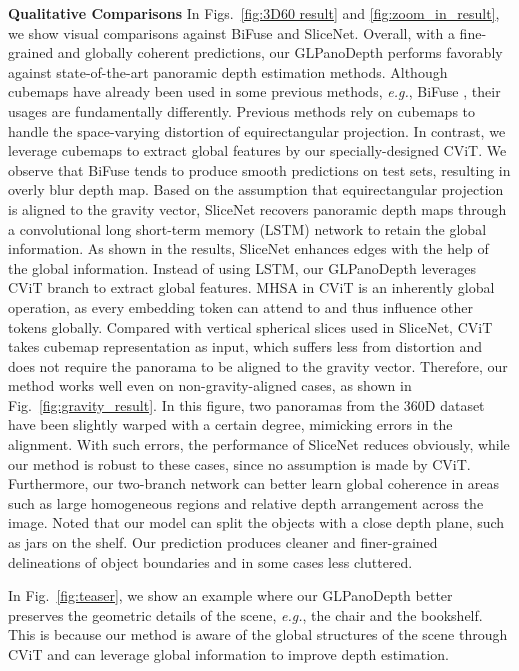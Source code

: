 \documentclass[10pt,twocolumn,letterpaper]{article}
\begin{document}
\textbf{Qualitative Comparisons }
In Figs.~\ref{fig:3D60 result} and \ref{fig:zoom_in_result}, we show visual comparisons against BiFuse and SliceNet.
Overall, with a fine-grained and globally coherent predictions, our GLPanoDepth performs favorably against state-of-the-art panoramic depth estimation methods.
Although cubemaps have already been used in some previous methods, \emph{e.g.}, BiFuse \cite{9157424}, their usages are fundamentally differently. Previous methods rely on cubemaps to handle the space-varying distortion of equirectangular projection. In contrast, we leverage cubemaps to extract global features by our specially-designed CViT. 
We observe that BiFuse tends to produce smooth predictions on test sets,
resulting in overly blur depth map. 
Based on the assumption that equirectangular projection is aligned to the gravity vector, SliceNet recovers panoramic depth maps through a convolutional long short-term memory (LSTM) network to retain the global information. As shown in the results, SliceNet enhances edges with the help of the global information. Instead of using LSTM, our GLPanoDepth leverages CViT branch to extract global features. MHSA in CViT is an inherently global operation, as every embedding token can attend to and thus influence other tokens globally. 
Compared with vertical spherical slices used in SliceNet, CViT takes cubemap representation as input, which suffers less from distortion and does not require the panorama to be aligned to the gravity vector. Therefore, our method works well even on non-gravity-aligned cases, as shown in Fig.~\ref{fig:gravity_result}. In this figure, two panoramas from the 360D dataset have been slightly warped with a certain degree, mimicking errors in the alignment. With such errors, the performance of SliceNet reduces obviously, while our method is robust to these cases, since no assumption is made by CViT.
Furthermore, our two-branch network can better learn global coherence in areas such as large homogeneous regions and relative depth arrangement across the image. 
Noted that our model can split the objects with a close depth plane, such as jars on the shelf. Our prediction produces cleaner and finer-grained delineations of object boundaries and in some cases less cluttered. 


In Fig.~\ref{fig:teaser}, we show an example where our GLPanoDepth better preserves the geometric details of the scene, \emph{e.g.}, the chair and the bookshelf. This is because our method is aware of the global structures of the scene through CViT and can leverage global information to improve depth estimation.
\end{document}
